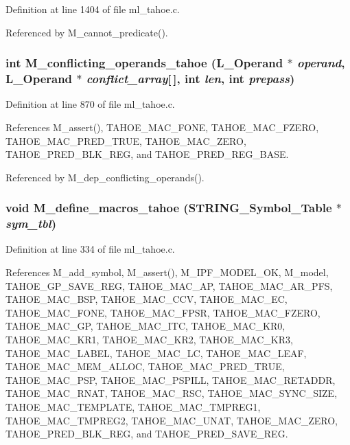 Definition at line 1404 of file ml\_\-tahoe.c.

Referenced by M\_\-cannot\_\-predicate().
\subsubsection{\setlength{\rightskip}{0pt plus 5cm}int M\_\-conflicting\_\-operands\_\-tahoe (L\_\-Operand $\ast$ {\em operand}, L\_\-Operand $\ast$ {\em conflict\_\-array}[$\,$], int {\em len}, int {\em prepass})}\label{ml__tahoe_8c_823462c9cf92055926ab0965c96537e3}




Definition at line 870 of file ml\_\-tahoe.c.

References M\_\-assert(), TAHOE\_\-MAC\_\-FONE, TAHOE\_\-MAC\_\-FZERO, TAHOE\_\-MAC\_\-PRED\_\-TRUE, TAHOE\_\-MAC\_\-ZERO, TAHOE\_\-PRED\_\-BLK\_\-REG, and TAHOE\_\-PRED\_\-REG\_\-BASE.

Referenced by M\_\-dep\_\-conflicting\_\-operands().
\subsubsection{\setlength{\rightskip}{0pt plus 5cm}void M\_\-define\_\-macros\_\-tahoe (\bf{STRING\_\-Symbol\_\-Table} $\ast$ {\em sym\_\-tbl})}\label{ml__tahoe_8c_33b23d1f3e10f1f11661c8e345e77630}




Definition at line 334 of file ml\_\-tahoe.c.

References M\_\-add\_\-symbol, M\_\-assert(), M\_\-IPF\_\-MODEL\_\-OK, M\_\-model, TAHOE\_\-GP\_\-SAVE\_\-REG, TAHOE\_\-MAC\_\-AP, TAHOE\_\-MAC\_\-AR\_\-PFS, TAHOE\_\-MAC\_\-BSP, TAHOE\_\-MAC\_\-CCV, TAHOE\_\-MAC\_\-EC, TAHOE\_\-MAC\_\-FONE, TAHOE\_\-MAC\_\-FPSR, TAHOE\_\-MAC\_\-FZERO, TAHOE\_\-MAC\_\-GP, TAHOE\_\-MAC\_\-ITC, TAHOE\_\-MAC\_\-KR0, TAHOE\_\-MAC\_\-KR1, TAHOE\_\-MAC\_\-KR2, TAHOE\_\-MAC\_\-KR3, TAHOE\_\-MAC\_\-LABEL, TAHOE\_\-MAC\_\-LC, TAHOE\_\-MAC\_\-LEAF, TAHOE\_\-MAC\_\-MEM\_\-ALLOC, TAHOE\_\-MAC\_\-PRED\_\-TRUE, TAHOE\_\-MAC\_\-PSP, TAHOE\_\-MAC\_\-PSPILL, TAHOE\_\-MAC\_\-RETADDR, TAHOE\_\-MAC\_\-RNAT, TAHOE\_\-MAC\_\-RSC, TAHOE\_\-MAC\_\-SYNC\_\-SIZE, TAHOE\_\-MAC\_\-TEMPLATE, TAHOE\_\-MAC\_\-TMPREG1, TAHOE\_\-MAC\_\-TMPREG2, TAHOE\_\-MAC\_\-UNAT, TAHOE\_\-MAC\_\-ZERO, TAHOE\_\-PRED\_\-BLK\_\-REG, and TAHOE\_\-PRED\_\-SAVE\_\-REG.

